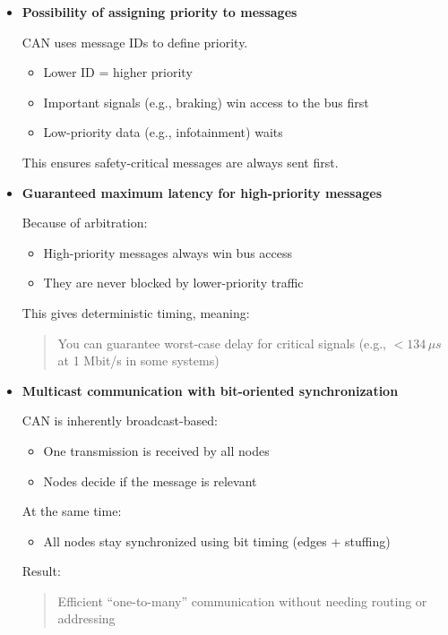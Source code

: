 \begin{itemize}

\item \textbf{Possibility of assigning priority to messages}

CAN uses message IDs to define priority.

\begin{itemize}
    \item Lower ID = higher priority
    \item Important signals (e.g., braking) win access to the bus first
    \item Low-priority data (e.g., infotainment) waits
\end{itemize}

This ensures safety-critical messages are always sent first.

\item \textbf{Guaranteed maximum latency for high-priority messages}

Because of arbitration:

\begin{itemize}
    \item High-priority messages always win bus access
    \item They are never blocked by lower-priority traffic
\end{itemize}

This gives deterministic timing, meaning:
\begin{quote}
You can guarantee worst-case delay for critical signals (e.g., $<134\,\mu s$ at 1 Mbit/s in some systems)
\end{quote}

\item \textbf{Multicast communication with bit-oriented synchronization}

CAN is inherently broadcast-based:

\begin{itemize}
    \item One transmission is received by all nodes
    \item Nodes decide if the message is relevant
\end{itemize}

At the same time:
\begin{itemize}
    \item All nodes stay synchronized using bit timing (edges + stuffing)
\end{itemize}

Result:
\begin{quote}
Efficient ``one-to-many'' communication without needing routing or addressing
\end{quote}


\end{itemize}
